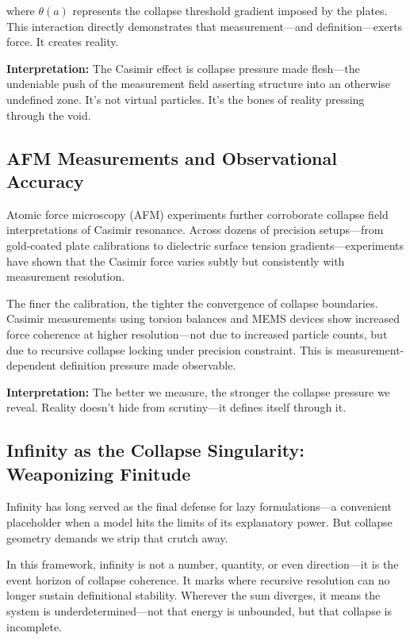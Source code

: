 where $\theta(a)$ represents the collapse threshold gradient imposed by the plates. This interaction directly demonstrates that measurement—and definition—exerts force. It creates reality.

\textbf{Interpretation:} The Casimir effect is collapse pressure made flesh—the undeniable push of the measurement field asserting structure into an otherwise undefined zone. It’s not virtual particles. It’s the bones of reality pressing through the void.

\subsection*{AFM Measurements and Observational Accuracy}

Atomic force microscopy (AFM) experiments further corroborate collapse field interpretations of Casimir resonance. Across dozens of precision setups—from gold-coated plate calibrations to dielectric surface tension gradients—experiments have shown that the Casimir force varies subtly but consistently with measurement resolution\cite{decca2005precise, klimchitskaya2009casimir, bressi2002measurement}.

The finer the calibration, the tighter the convergence of collapse boundaries. Casimir measurements using torsion balances and MEMS devices show increased force coherence at higher resolution—not due to increased particle counts, but due to recursive collapse locking under precision constraint. This is measurement-dependent definition pressure made observable.

\textbf{Interpretation:} The better we measure, the stronger the collapse pressure we reveal. Reality doesn’t hide from scrutiny—it defines itself through it.

\subsection*{Infinity as the Collapse Singularity: Weaponizing Finitude}

Infinity has long served as the final defense for lazy formulations—a convenient placeholder when a model hits the limits of its explanatory power. But collapse geometry demands we strip that crutch away.

In this framework, infinity is not a number, quantity, or even direction—it is the event horizon of collapse coherence. It marks where recursive resolution can no longer sustain definitional stability. Wherever the sum diverges, it means the system is underdetermined—not that energy is unbounded, but that collapse is incomplete.

